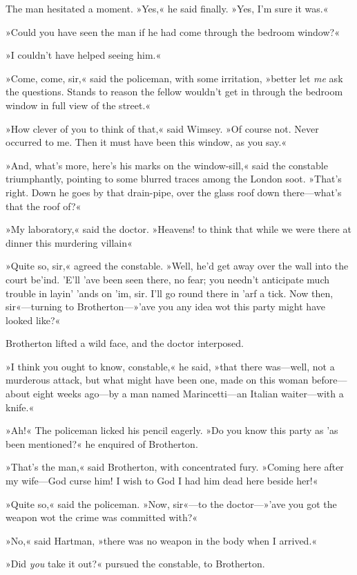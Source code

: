 The man hesitated a moment. »Yes,« he said finally. »Yes, I'm sure it was.«

»Could you have seen the man if he had come through the bedroom window?«

»I couldn't have helped seeing him.«

»Come, come, sir,« said the policeman, with some irritation, »better let \textit{me} ask the questions. Stands to reason the fellow wouldn't get in through the bedroom window in full view of the street.«

»How clever of you to think of that,« said Wimsey. »Of course not. Never occurred to me. Then it must have been this window, as you say.«

»And, what's more, here's his marks on the window-sill,« said the constable triumphantly, pointing to some blurred traces among the London soot. »That's right. Down he goes by that drain-pipe, over the glass roof down there—what's that the roof of?«

»My laboratory,« said the doctor. »Heavens! to think that while we were there at dinner this murdering villain\longdash«

»Quite so, sir,« agreed the constable. »Well, he'd get away over the wall into the court be'ind. 'E'll 'ave been seen there, no fear; you needn't anticipate much trouble in layin' 'ands on 'im, sir. I'll go round there in 'arf a tick. Now then, sir«—turning to Brotherton—»'ave you any idea wot this party might have looked like?«

Brotherton lifted a wild face, and the doctor interposed.

»I think you ought to know, constable,« he said, »that there was—well, not a murderous attack, but what might have been one, made on this woman before—about eight weeks ago—by a man named Marincetti—an Italian waiter—with a knife.«

»Ah!« The policeman licked his pencil eagerly. »Do you know this party as 'as been mentioned?« he enquired of Brotherton.

»That's the man,« said Brotherton, with concentrated fury. »Coming here after my wife—God curse him! I wish to God I had him dead here beside her!«

»Quite so,« said the policeman. »Now, sir«—to the doctor—»'ave you got the weapon wot the crime was committed with?«

»No,« said Hartman, »there was no weapon in the body when I arrived.«

»Did \textit{you} take it out?« pursued the constable, to Brotherton.

